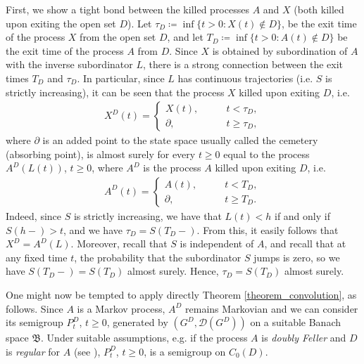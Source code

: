 \documentclass[reqno]{amsart}
\theoremstyle{remark}
\numberwithin{equation}{section} %
\newcommand{\1}{\mathds{1}}
\begin{document}
	First, we show a tight bond between the killed processes $A$ and $X$ (both killed upon exiting the open set $D$). Let $\tau_D\coloneq \inf\{t>0:X(t) \notin D\}$, be the exit time of the process $X$ from the open set $D$, and let $T_D \coloneqq \inf  \{ t > 0 : A(t) \notin D \}$ be the exit time of the process $A$ from $D$. Since $X$ is obtained by subordination of $A$ with the inverse subordinator $L$, there is a strong connection between the exit times $T_D$ and $\tau_D$. In particular, since $L$ has continuous trajectories (i.e. $S$ is strictly increasing), it can be seen that the process $X$ killed upon exiting $D$, i.e.
	\begin{align}
		X^D(t) = \begin{cases} X(t), \qquad & t <\tau_D, \\ \partial, & t \geq \tau_D ,\end{cases}
	\end{align}
	where $\partial$ is an added point to the state space usually called the cemetery (absorbing point), is almost surely for every $t \geq 0$ equal to the process $A^D(L(t))$, $t\ge0$, where $A^D$ is the process $A$ killed upon exiting $D$, i.e.
	\begin{align}
		A^D(t) = \begin{cases}
			A(t), \qquad &t < T_D, \\
			\partial, & t \geq T_D.
		\end{cases}
		\label{killed_process}
	\end{align}
	Indeed, since $S$ is strictly increasing, we have that $L(t) < h$ if and only if $S(h-)>t$, and we have $\tau_D = S(T_D-)$. From this, it easily follows that $X^D=A^D(L)$. Moreover, recall that $S$ is independent of $A$, and recall that at any fixed time $t$, the probability that {the subordinator $S$} jumps is zero, so we have $S(T_D-)=S(T_D)$ almost surely. Hence, $\tau_D=S(T_D)$ almost surely.
	
	
	
	One might now be tempted to apply directly Theorem \ref{theorem_convolution}, as follows. Since $A$ is a Markov process, $A^D$ remains Markovian and we can consider its semigroup $P^D_t$, $t \geq 0$,  generated by $(G^D, \mathcal{D}(G^D))$ on a suitable Banach space $\mathfrak{B}$. Under suitable assumptions, e.g. if the process $A$ is \textit{doubly Feller} and $D$ is \textit{regular} for $A$ (see \cite{Chung-DoublyFeller-Seminar85}), $P^D_t$, $t \geq 0$, is a semigroup on $C_0(D)$.
	
\end{document}
